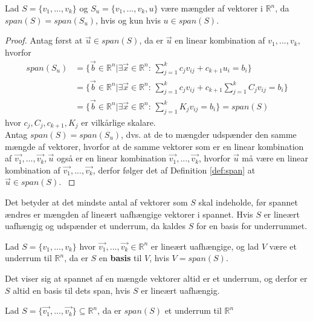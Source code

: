 \begin{stn}
Lad $S = \{v_1,...,v_k\}$ og $S_u = \{v_1,...,v_k, u\}$ være mængder af vektorer i $\mathds{R}^n$, da $span(S) = span(S_u)$, hvis og kun hvis $u \in span(S)$.
\end{stn}
\begin{proof}
Antag først at $\vec{u} \in span(S)$, da er $\vec{u}$ en linear kombination af $v_1,..., v_k$, hvorfor
\begin{align*}
span(S_u) &= \{ \vec{b} \in \mathds{R}^n| \exists \vec{x} \in \mathds{R}^n: \, \sum_{j=1}^k c_j v_{ij} + c_{k+1} u_i  = b_i\}
\\&= \{ \vec{b} \in \mathds{R}^n| \exists \vec{x} \in \mathds{R}^n: \, \sum_{j=1}^k c_j v_{ij} + c_{k+1} \sum_{j=1}^k C_j v_{ij}  = b_i\}
\\&= \{ \vec{b} \in \mathds{R}^n| \exists \vec{x} \in \mathds{R}^n: \, \sum_{j=1}^k K_j v_{ij}  = b_i\} = span(S)
\end{align*}
hvor $c_j, C_j, c_{k+1}, K_j$ er vilkårlige skalare.
\\ Antag $span(S) = span(S_u)$, dvs. at de to mængder udspænder den samme mængde af vektorer, hvorfor at de samme vektorer som er en linear kombination af $\vec{v_1},...,\vec{v_k}, \vec{u}$ også er en linear kombination $\vec{v_1},..., \vec{v_k}$, hvorfor $\vec{u}$ må være en linear kombination af  $\vec{v_1},..., \vec{v_k}$, derfor følger det af Definition \ref{def:span} at $\vec{u} \in span(S).$
\label{stn:akvivalentespan}
\end{proof}
Det betyder at det mindste antal af vektorer som $S$ skal indeholde, før spannet ændres er mængden af lineært uafhængige vektorer i spannet.
Hvis $S$ er lineært uafhængig og udspænder et underrum, da kaldes $S$ for en basis for underrummet.
\begin{defn}[Basis]
Lad $S =\{v_1,...,v_k\}$ hvor $\vec{v_1},...,\vec{v_k} \in \mathds{R}^n$ er lineært uafhængige, og lad $V$ være et underrum til $\mathds{R}^n$, da er $S$ en \textbf{basis} til $V$, hvis $V = span(S)$.
\label{def:basis}
\end{defn}
Det viser sig at spannet af en mængde vektorer altid er et underrum, og derfor er $S$ altid en basis til dets span, hvis $S$ er lineært uafhængig.
\begin{stn}
Lad $S=\{\vec{v_1},...,\vec{v_k}\} \subseteq \mathds{R}^n$, da er $span(S)$ et underrum til $\mathds{R}^n$
\label{stn:spanunderrum}
\end{stn}
